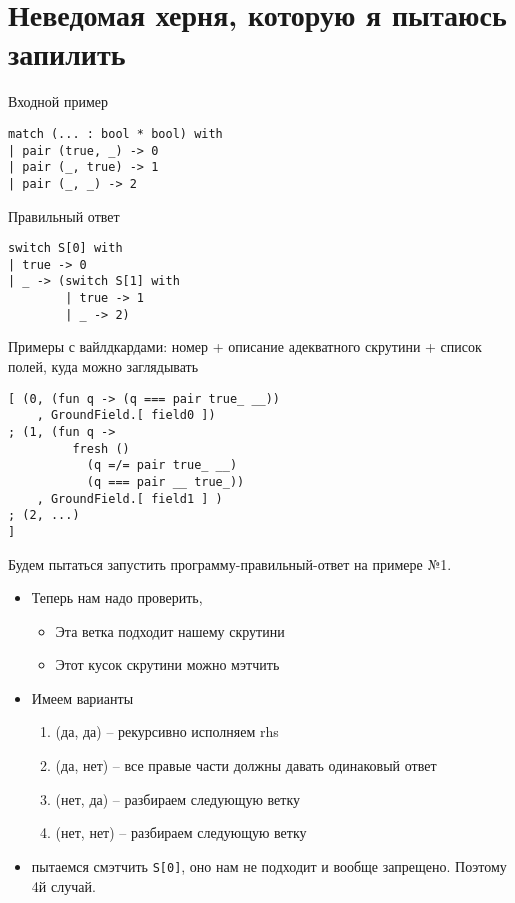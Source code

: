 \documentclass[a5paper,12pt]{article}
\begin{document}
\section{Неведомая херня, которую я пытаюсь запилить}
Входной пример
\begin{verbatim}
match (... : bool * bool) with
| pair (true, _) -> 0
| pair (_, true) -> 1
| pair (_, _) -> 2
\end{verbatim}
Правильный ответ
\begin{verbatim}
switch S[0] with
| true -> 0
| _ -> (switch S[1] with
        | true -> 1
        | _ -> 2)
\end{verbatim}
Примеры с вайлдкардами: номер + описание адекватного скрутини + список полей, куда можно заглядывать
\begin{verbatim}
[ (0, (fun q -> (q === pair true_ __))
    , GroundField.[ field0 ])
; (1, (fun q ->
         fresh () 
           (q =/= pair true_ __) 
           (q === pair __ true_))
    , GroundField.[ field1 ] )
; (2, ...)
]
\end{verbatim}
Будем пытаться запустить программу-правильный-ответ на примере №1.
\begin{itemize}
\item Теперь нам надо проверить, 
\begin{itemize}
\item Эта ветка подходит нашему скрутини
\item Этот кусок скрутини можно мэтчить
\end{itemize}
\item Имеем варианты
\begin{enumerate}
\item (да, да) -- рекурсивно исполняем rhs 
\item (да, нет) -- все правые части должны давать одинаковый ответ
\item (нет, да) -- разбираем следующую ветку
\item (нет, нет) -- разбираем следующую ветку
\end{enumerate}
\item пытаемся смэтчить \verb=S[0]=, оно нам не подходит и вообще запрещено. Поэтому 4й случай.
\end{itemize}
\end{document}
